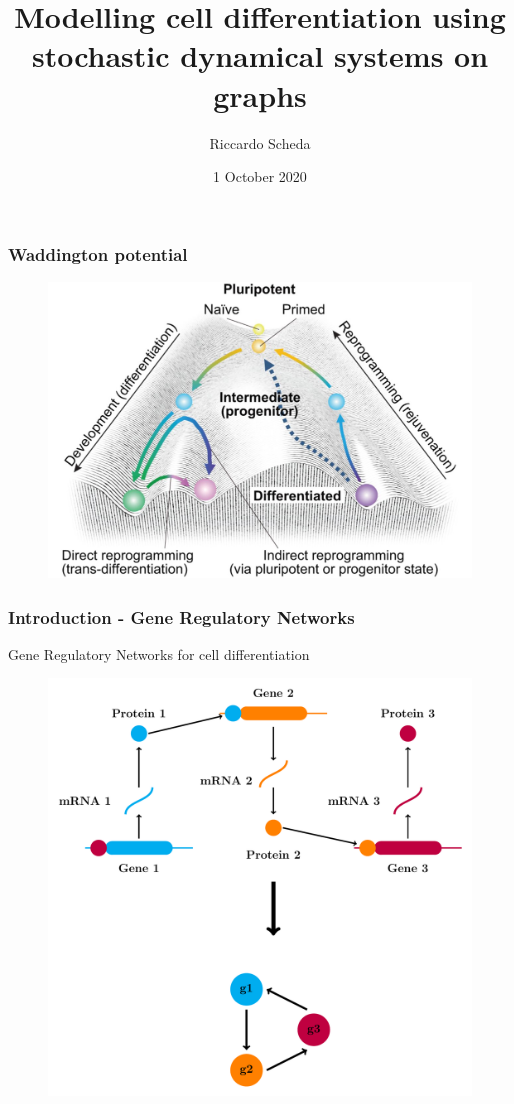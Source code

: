 \documentclass{beamer}
\title{Modelling cell differentiation using stochastic dynamical systems on
graphs}%
\institute[]{\\University of Bologna}
\author{\Large{Riccardo Scheda}}
\date{1 October 2020}
\begin{document}
\begin{frame}
\maketitle
\end{frame}


\begin{frame}
\frametitle{Waddington potential}

\begin{figure}[h]
\centering
\includegraphics[scale=1]{landscape.jpg}
\end{figure}
\end{frame}



\begin{frame}
\frametitle{Introduction - Gene Regulatory Networks}
Gene Regulatory Networks for cell differentiation

\begin{figure}[h]
\centering
\includegraphics[scale=0.2]{images/grnn.pdf}
\end{figure}
\end{frame}
\end{document}
